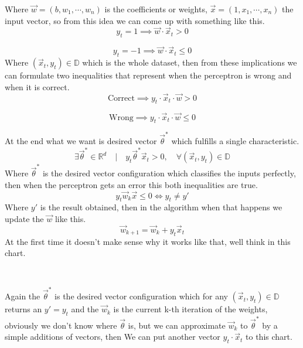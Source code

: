 \documentclass[12pt]{article}
\begin{document}
Where $\vec{w} = (b, w_1, \cdots, w_n)$
is the coefficients or weights, $\vec{x} = (1, x_1, \cdots, x_n)$
the input vector, so from this idea we can come up
with something like this.
\[
  y_t = 1 \implies \vec{w} \cdot \vec{x}_t > 0
\]

\[
  y_t =  - 1 \implies \vec{w} \cdot \vec{x}_t \le 0
\]
Where $(\vec{x}_t, y_t) \in \mathbb{D}$ which is the whole dataset, then from these implications
we can formulate two inequalities that
represent when the perceptron is wrong and when it is correct.
\[
  \text{Correct} \implies y_t \cdot \vec{x}_t \cdot \vec{w} > 0
\]

\[
  \text{Wrong} \implies y_t \cdot \vec{x}_t \cdot \vec{w} \le 0
\]

At the end what we want is desired vector $\vec{\theta}^*$ which fulfills a single characteristic.
\[
  \exists \vec{\theta}^* \in \mathbb{R}^{d} \quad|\quad y_t\vec{\theta}^*\vec{x}_t > 0,\quad
  \forall (\vec{x}_t, y_t) \in \mathbb{D}
\]
Where $\vec{\theta}^*$ is the desired vector configuration which classifies the inputs perfectly,
then when the perceptron gets an error this both inequalities are true.
\[
  y_t\vec{w}_k \vec{x} \le 0 \Leftrightarrow  y_t \not = y'
\]
Where $y'$ is the result obtained,
then in the algorithm when that happens we update the $\vec{w}$ like this.
\[
  \vec{w}_{k + 1} = \vec{w}_{k} + y_t\vec{x}_t
\]
At the first time it doesn't make sense why it works like that, well think in this chart.
\begin{center}
 \\
\end{center}
Again the $\vec{\theta}^*$ is the desired vector configuration which for any
$(\vec{x}_t, y_t) \in \mathbb{D}$ returns an $y' = y_t$ and the $\vec{w}_k$ is the current k-th iteration
of the weights, obviously we don't know where $\vec{\theta}$ is, but we can approximate $\vec{w}_k$
to $\vec{\theta}^*$ by a 
simple additions of vectors,
then We can put another vector $y_t \cdot \vec{x}_t$ to this chart.
\begin{center}
 \\
\end{center}
\end{document}
